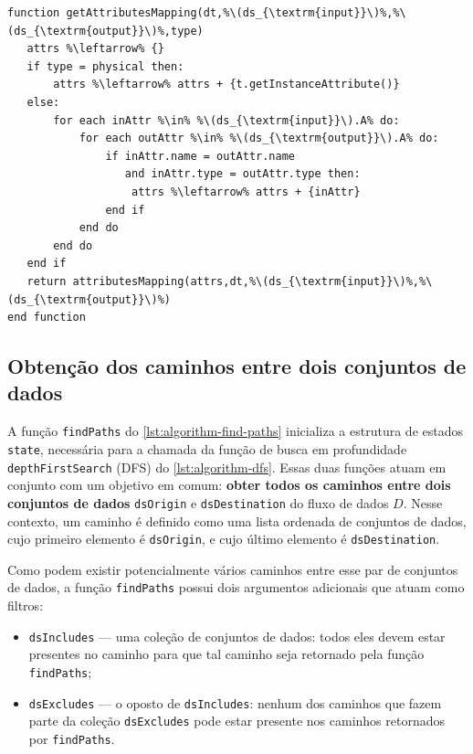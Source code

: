 \begin{minipage}[c]{0.95\textwidth}
\begin{lstlisting}[language=pseudocode,label={lst:algorithm-attribute-mappings},caption={[Obtenção de múltiplos mapeamentos de atributos]Obtenção de múltiplos mapeamentos de atributos entre dois conjuntos de dados adjacentes.}]
function getAttributesMapping(dt,%\(ds_{\textrm{input}}\)%,%\(ds_{\textrm{output}}\)%,type)
   attrs %\leftarrow% {}
   if type = physical then:
       attrs %\leftarrow% attrs + {t.getInstanceAttribute()}
   else:
       for each inAttr %\in% %\(ds_{\textrm{input}}\).A% do:
           for each outAttr %\in% %\(ds_{\textrm{output}}\).A% do:
               if inAttr.name = outAttr.name
                  and inAttr.type = outAttr.type then:
                   attrs %\leftarrow% attrs + {inAttr}
               end if
           end do
       end do
   end if
   return attributesMapping(attrs,dt,%\(ds_{\textrm{input}}\)%,%\(ds_{\textrm{output}}\)%)
end function
\end{lstlisting}
\end{minipage}


\subsection{Obtenção dos caminhos entre dois conjuntos de dados}

A função \texttt{findPaths} do \autoref{lst:algorithm-find-paths} inicializa a estrutura de estados \texttt{state}, necessária para a chamada da função de busca em profundidade  \texttt{depthFirstSearch} (DFS) do \autoref{lst:algorithm-dfs}. Essas duas funções atuam em conjunto com um objetivo em comum: \textbf{obter todos os caminhos entre dois conjuntos de dados} \texttt{dsOrigin} e \texttt{dsDestination} do fluxo de dados \(D\).
Nesse contexto, um caminho é definido como uma lista ordenada de conjuntos de dados, cujo primeiro elemento é \texttt{dsOrigin}, e cujo último elemento é \texttt{dsDestination}.

Como podem existir potencialmente vários caminhos entre esse par de conjuntos de dados, a função \texttt{findPaths} possui dois argumentos adicionais que atuam como filtros:

\begin{itemize}
    \item \texttt{dsIncludes} --- uma coleção de conjuntos de dados: todos eles devem estar presentes no caminho para que tal caminho seja retornado pela função \texttt{findPaths};
    \item \texttt{dsExcludes} --- o oposto de \texttt{dsIncludes}: nenhum dos caminhos que fazem parte da coleção \texttt{dsExcludes} pode estar presente nos caminhos retornados por \texttt{findPaths}.
\end{itemize}

